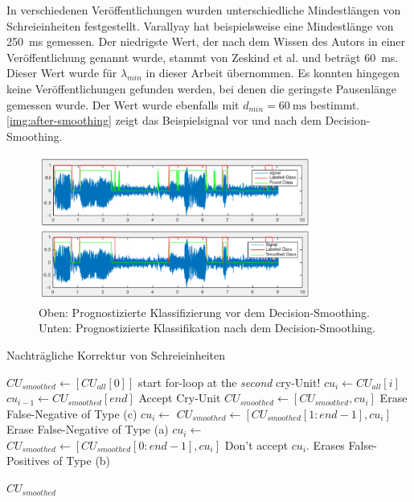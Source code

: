 In verschiedenen Veröffentlichungen wurden unterschiedliche Mindestlängen von Schreieinheiten festgestellt. Varallyay \cite[S. 8]{cry_thesis} hat beispielsweise eine Mindestlänge von \SI{250}{\milli\second} gemessen. Der niedrigste Wert, der nach dem Wissen des Autors in einer Veröffentlichung genannt wurde, stammt von Zeskind et al. \cite[S. 325]{rythmic} und beträgt  \SI{60}{\milli\second}. Dieser Wert wurde für $\lambda_{min}$ in dieser Arbeit übernommen. Es konnten hingegen keine Veröffentlichungen gefunden werden, bei denen die geringste Pausenlänge gemessen wurde. Der Wert wurde ebenfalls mit $d_{min} = \SI{60}{\milli\second}$ bestimmt. \autoref{img:after-smoothing} zeigt das Beispielsignal vor und nach dem Decision-Smoothing. 

\begin{figure}[h]
	\centering
	\includegraphics[width=0.8\textwidth]{bilder/smoothing04.png}
	\caption[Klassifizierung nach dem Decision-Smoothing]{Oben: Prognostizierte Klassifizierung vor dem Decision-Smoothing. Unten: Prognostizierte Klassifikation nach dem Decision-Smoothing.}
	\label{img:after-smoothing}
\end{figure}

\begin{algorithm}[h]
	\caption{Nachträgliche Korrektur von Schreieinheiten}
	\label{alg:decisionSmoothing}
	\begin{algorithmic}[1]
		\State $CU_{smoothed} \gets[CU_{all}[0]] $
		\State \Comment start for-loop at the \emph{second} cry-Unit!
			\State $cu_i \gets CU_{all}[i]$
			\State $cu_{i-1} \gets CU_{smoothed}[end]$
			\State \Comment Accept Cry-Unit
					\State $CU_{smoothed} \gets [CU_{smoothed}, cu_i] $
			\Else
					\State \Comment Erase False-Negative of Type (c)
					\State $cu_i \gets $ 
					\State $CU_{smoothed} \gets [CU_{smoothed}[1:end-1], cu_i] $
			\EndIf
			\Else
			\State \Comment Erase False-Negative of Type (a)
			\State $cu_i \gets $ 
			\State $CU_{smoothed} \gets [CU_{smoothed}[0:end-1], cu_i] $
			\Else
			\State \Comment Don't accept $cu_i$. Erases False-Positives of Type (b)
			\EndIf
			\EndIf
		\EndFor
		
		\Return $CU_{smoothed}$
		\EndFunction
		
	\end{algorithmic}
\end{algorithm}



